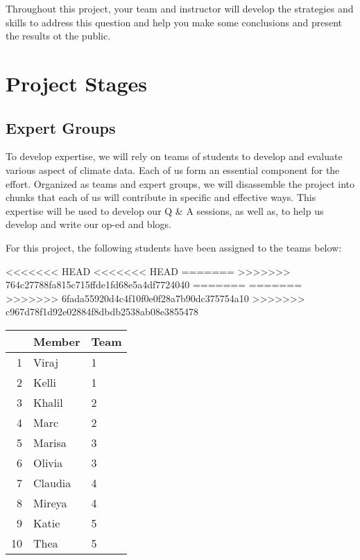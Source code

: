 \documentclass{article}\usepackage[]{graphicx}\usepackage[]{color}
\begin{document}
Throughout this project, your team and instructor will develop the strategies and skills to address this question and help you make some conclusions and present the results ot the public.

\section{Project Stages}

\subsection{Expert Groups}

To develop expertise, we will rely on teams of students to develop and evaluate various aspect of climate data. Each of us form an essential component for the effort. Organized as teams and expert groups, we will disassemble the project into chunks that each of us will contribute in specific and effective ways. This expertise will be used to develop our Q \& A sessions, as well as, to help us develop and write our op-ed and blogs.

For this project, the following students have been assigned to the teams below:

<<<<<<< HEAD
<<<<<<< HEAD
=======
>>>>>>> 764c27788fa815c715ffde1fd68e5a4df7724040
=======
=======
>>>>>>> 6fada55920d4c4f10f0e0f28a7b90dc375754a10
>>>>>>> c967d78f1d92e02884f8dbdb2538ab08e3855478
\begin{table}[ht]
\centering
\begin{tabular}{rll}
  \hline
 & Member & Team \\ 
  \hline
1 & Viraj & 1 \\ 
  2 & Kelli & 1 \\ 
  3 & Khalil & 2 \\ 
  4 & Marc & 2 \\ 
  5 & Marisa & 3 \\ 
  6 & Olivia & 3 \\ 
  7 & Claudia & 4 \\ 
  8 & Mireya & 4 \\ 
  9 & Katie & 5 \\ 
  10 & Thea & 5 \\ 
   \hline
\end{tabular}
\end{table}
\end{document}
